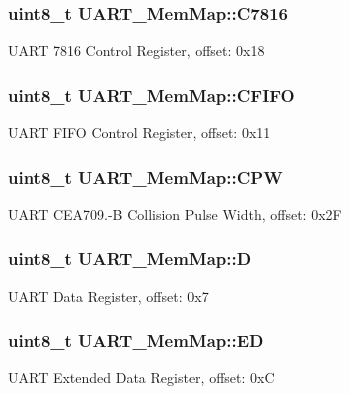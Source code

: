 \subsubsection[{C7816}]{\setlength{\rightskip}{0pt plus 5cm}uint8\+\_\+t U\+A\+R\+T\+\_\+\+Mem\+Map\+::\+C7816}\label{struct_u_a_r_t___mem_map_a8c98b0dd2335e137c509ba63636f5089}
U\+A\+R\+T 7816 Control Register, offset\+: 0x18 \hypertarget{struct_u_a_r_t___mem_map_a9f359b0d3af7e6bbdb3ae2cce221d879}{}
\subsubsection[{C\+F\+I\+F\+O}]{\setlength{\rightskip}{0pt plus 5cm}uint8\+\_\+t U\+A\+R\+T\+\_\+\+Mem\+Map\+::\+C\+F\+I\+F\+O}\label{struct_u_a_r_t___mem_map_a9f359b0d3af7e6bbdb3ae2cce221d879}
U\+A\+R\+T F\+I\+F\+O Control Register, offset\+: 0x11 \hypertarget{struct_u_a_r_t___mem_map_aadd1a3fac140047bd8625a4d8fe5a512}{}
\subsubsection[{C\+P\+W}]{\setlength{\rightskip}{0pt plus 5cm}uint8\+\_\+t U\+A\+R\+T\+\_\+\+Mem\+Map\+::\+C\+P\+W}\label{struct_u_a_r_t___mem_map_aadd1a3fac140047bd8625a4d8fe5a512}
U\+A\+R\+T C\+E\+A709.-\/\+B Collision Pulse Width, offset\+: 0x2\+F \hypertarget{struct_u_a_r_t___mem_map_a3568c1640bf7dc0e1214cddcea1e8f0c}{}
\subsubsection[{D}]{\setlength{\rightskip}{0pt plus 5cm}uint8\+\_\+t U\+A\+R\+T\+\_\+\+Mem\+Map\+::\+D}\label{struct_u_a_r_t___mem_map_a3568c1640bf7dc0e1214cddcea1e8f0c}
U\+A\+R\+T Data Register, offset\+: 0x7 \hypertarget{struct_u_a_r_t___mem_map_a0f318dc0e65102cb79566d2b22f064b2}{}
\subsubsection[{E\+D}]{\setlength{\rightskip}{0pt plus 5cm}uint8\+\_\+t U\+A\+R\+T\+\_\+\+Mem\+Map\+::\+E\+D}\label{struct_u_a_r_t___mem_map_a0f318dc0e65102cb79566d2b22f064b2}
U\+A\+R\+T Extended Data Register, offset\+: 0x\+C \hypertarget{struct_u_a_r_t___mem_map_a97cac628a8a40a8369eb7339bd12cb3f}{}
